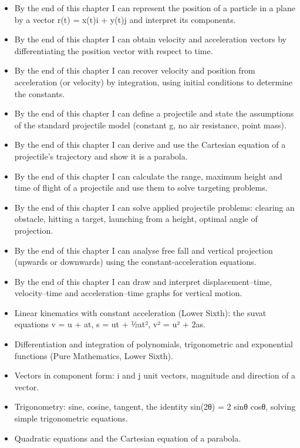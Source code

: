 \documentclass[11pt]{article}
\begin{document}
\begin{objectifs}
\begin{itemize}
\item By the end of this chapter I can represent the position of a particle in a plane by a vector r(t) = x(t)i + y(t)j and interpret its components.
\item By the end of this chapter I can obtain velocity and acceleration vectors by differentiating the position vector with respect to time.
\item By the end of this chapter I can recover velocity and position from acceleration (or velocity) by integration, using initial conditions to determine the constants.
\item By the end of this chapter I can define a projectile and state the assumptions of the standard projectile model (constant g, no air resistance, point mass).
\item By the end of this chapter I can derive and use the Cartesian equation of a projectile's trajectory and show it is a parabola.
\item By the end of this chapter I can calculate the range, maximum height and time of flight of a projectile and use them to solve targeting problems.
\item By the end of this chapter I can solve applied projectile problems: clearing an obstacle, hitting a target, launching from a height, optimal angle of projection.
\item By the end of this chapter I can analyse free fall and vertical projection (upwards or downwards) using the constant-acceleration equations.
\item By the end of this chapter I can draw and interpret displacement–time, velocity–time and acceleration–time graphs for vertical motion.
\end{itemize}
\end{objectifs}

\begin{prerequis}
\begin{itemize}
\item Linear kinematics with constant acceleration (Lower Sixth): the suvat equations v = u + at, s = ut + ½at², v² = u² + 2as.
\item Differentiation and integration of polynomials, trigonometric and exponential functions (Pure Mathematics, Lower Sixth).
\item Vectors in component form: i and j unit vectors, magnitude and direction of a vector.
\item Trigonometry: sine, cosine, tangent, the identity sin(2θ) = 2 sinθ cosθ, solving simple trigonometric equations.
\item Quadratic equations and the Cartesian equation of a parabola.
\end{itemize}
\end{prerequis}
\end{document}
